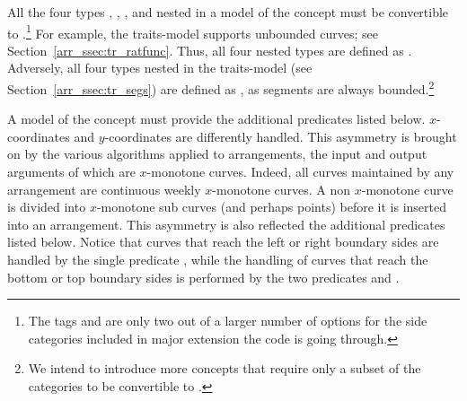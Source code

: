 All the four types ,
, , and
 nested in a model of the concept
 must be convertible to
.\footnote{The tags
   and  are only
  two out of a larger number of options for the side categories
  included in major extension the code is going through.}
For example, the  traits-model supports
unbounded curves; see Section~\ref{arr_ssec:tr_ratfunc}. Thus, all
four nested types are defined as .
Adversely, all four types nested in the 
traits-model (see Section~\ref{arr_ssec:tr_segs}) are defined as
, as segments are always
bounded.\footnote{We intend to introduce more concepts that require
  only a subset of the categories to be convertible to
  .}

A model of the concept  must provide
the additional predicates listed below. 
$x$-coordinates and $y$-coordinates are differently handled. This
asymmetry is brought on by the various algorithms applied to
arrangements, the input and output arguments of which are $x$-monotone
curves. Indeed, all curves maintained by any arrangement are
continuous weekly $x$-monotone curves. A non $x$-monotone curve is
divided into $x$-monotone sub curves (and perhaps points) before it
is inserted into an arrangement. This asymmetry is also reflected the
additional predicates listed below. Notice that curves that reach the
left or right boundary sides are handled by the single predicate
, while the handling of curves that
reach the bottom or top boundary sides is performed by the two
predicates  and .

